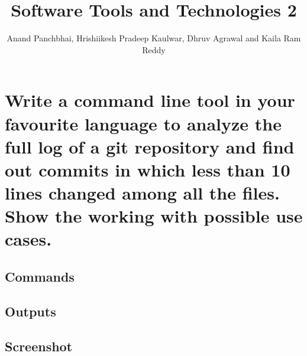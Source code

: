 \documentclass[onecolumn]{IEEEtran}
\title{Software Tools and Technologies 2}
\author{Anand Panchbhai, Hrishiikesh Pradeep Kaulwar, Dhruv Agrawal and Kaila Ram Reddy }
\begin{document}
\maketitle
\section{Write a command line tool in your favourite language to analyze the full log of a git repository and find out commits in which less than 10 lines changed among all the files.
Show the working with possible use cases.}
\subsection{Commands}
\subsection{Outputs}
\subsection{Screenshot}
\end{document}
